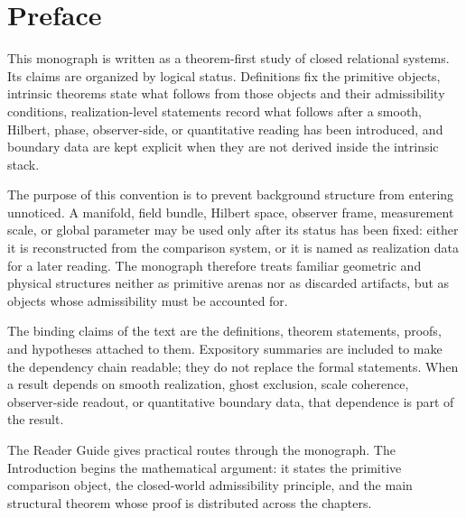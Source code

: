 \chapter*{Preface}
{}
\label{ch:preface}
This monograph is written as a theorem-first study of closed relational
systems.  Its claims are organized by logical status.  Definitions fix the
primitive objects, intrinsic theorems state what follows from those objects
and their admissibility conditions, realization-level statements record what
follows after a smooth, Hilbert, phase, observer-side, or quantitative
reading has been introduced, and boundary data are kept explicit when they
are not derived inside the intrinsic stack.

The purpose of this convention is to prevent background structure from
entering unnoticed.  A manifold, field bundle, Hilbert space, observer
frame, measurement scale, or global parameter may be used only after its
status has been fixed: either it is reconstructed from the comparison
system, or it is named as realization data for a later reading.  The monograph
therefore treats familiar geometric and physical structures neither as
primitive arenas nor as discarded artifacts, but as objects whose
admissibility must be accounted for.

The binding claims of the text are the definitions, theorem statements,
proofs, and hypotheses attached to them.  Expository summaries are included
to make the dependency chain readable; they do not replace the formal
statements.  When a result depends on smooth realization, ghost exclusion,
scale coherence, observer-side readout, or quantitative boundary data, that
dependence is part of the result.

The Reader Guide gives practical routes through the monograph.  The
Introduction begins the mathematical argument: it states the primitive
comparison object, the closed-world admissibility principle, and the main
structural theorem whose proof is distributed across the chapters.
